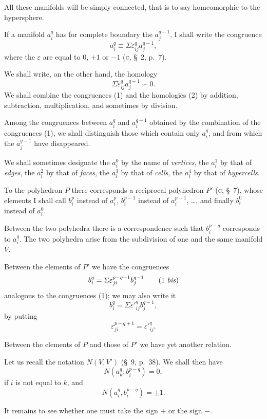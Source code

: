 \documentclass{article}
\begin{document}
All these manifolds will be simply connected, that is to say homeomorphic to the hypersphere.

If a manifold $a^{q}_{i}$ has for complete boundary the $a^{q-1}_{j}$, I shall write the congruence
\[ a^{q}_{i} \equiv \Sigma \varepsilon^{q}_{ij} a^{q-1}_{j}, \tag{1} \]
where the $\varepsilon$ are equal to 0, $+1$ or $-1$ (\textsc{c}, \S~2, p.\ 7).

We shall write, on the other hand, the homology
\[ \Sigma \varepsilon^{q}_{ij} a^{q-1}_{j} \backsim 0. \tag{2} \]
We shall combine the congruences (1) and the homologies (2) by addition, subtraction, multiplication, and sometimes by division.

Among the congruences between $a^{q}_{i}$ and $a^{q-1}_{i}$ obtained by the combination of the congruences (1), we shall distinguish those which contain only $a^{q}_{i}$, and from which the $a^{q-1}_{j}$ have disappeared.

We shall sometimes designate the $a^{0}_{i}$ by the name of \emph{vertices}, the $a^{1}_{i}$ by that of \emph{edges}, the $a^{2}_{i}$ by that of \emph{faces}, the $a^{3}_{i}$ by that of \emph{cells}, the $a^{4}_{i}$ by that of \emph{hypercells}.

To the polyhedron $P$ there corresponds a reciprocal polyhedron $P'$ (\textsc{c}, \S~7), whose elements I shall call $b^{p}_{i}$ instead of $a^{p}_{i}$, $b^{p-1}_{i}$ instead of $a^{p-1}_{i}$, \ldots, and finally $b^{0}_{i}$ instead of $a^{0}_{i}$.

Between the two polyhedra there is a correspondence such that $b^{p-q}_{i}$ corresponds to $a^{q}_{i}$. The two polyhedra arise from the subdivision of one and the same manifold $V$.

Between the elements of $P'$ we have the congruences
\[ b^{q}_{i} = \Sigma \varepsilon^{p-q+1}_{ji} b^{q-1}_{j} \tag{1 \textit{bis}} \]
analogous to the congruences (1); we may also write it
\[ b^{q}_{i} = \Sigma \varepsilon'^{q}_{ij} b^{q-1}_{j}, \]
by putting
\[ \varepsilon^{p-q+1}_{ji} = \varepsilon'^{q}_{ij}. \]

Between the elements of $P$ and those of $P'$ we have yet another relation.

Let us recall the notation $N(V, V')$ (\S~9, p.\ 38). We shall then have
\[ N(a^{q}_{k}, b^{p-q}_{i}) = 0, \]
if $i$ is not equal to $k$, and
\[ N(a^{q}_{i}, b^{p-q}_{i}) = \pm 1. \]

It remains to see whether one must take the sign $+$ or the sign $-$.
\end{document}
